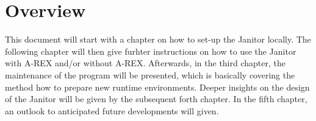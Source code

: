 \section{Overview}

This document will start with a chapter on how to set-up the Janitor locally. The following chapter will then give furhter instructions on how to 
use the Janitor with A-REX and/or without A-REX. Afterwards, in the third chapter, the maintenance of the program will be presented, 
which is basically covering the method how to prepare new runtime environments. Deeper insights on the design of the Janitor will 
be given by the subsequent forth chapter. In the fifth chapter, an outlook to anticipated future developments will given.






 

